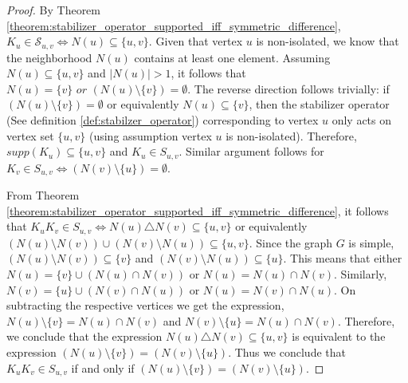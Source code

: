 \documentclass{article}
\begin{document}
\begin{proof}
By Theorem \ref{theorem:stabilizer_operator_supported_iff_symmetric_difference}, $ K_u \in \mathcal{S}_{u,v} \iff N(u) \subseteq \{u, v\} $. Given that vertex $ u $ is non-isolated, we know that the neighborhood $ N(u) $ contains at least one element. Assuming $ N(u) \subseteq \{u, v\} $ and $ |N(u)| > 1 $, it follows that $ N(u) = \{v\} \textit{ or }  (N(u) \setminus \{v\}) = \emptyset$. The reverse direction follows trivially: if $(N(u) \setminus \{v\}) = \emptyset$ or equivalently $ N(u) \subseteq \{v\} $, then the stabilizer operator (See definition \ref{def:stabilzer_operator}) corresponding to vertex $u$ only acts on vertex set $\{u, v\}$ (using assumption vertex $u$ is non-isolated). Therefore, $supp(K_u) \subseteq \{u, v\}$ and $K_u \in S_{u,v}$. Similar argument follows for $ K_v \in S_{u,v} \iff (N(v) \setminus \{u\}) = \emptyset $.

 

From Theorem \ref{theorem:stabilizer_operator_supported_iff_symmetric_difference}, it follows that $K_u K_v \in S_{u,v} \iff N(u) \triangle N(v) \subseteq \{u, v\}$ or equivalently $(N(u) \setminus N(v)) \cup (N(v) \setminus N(u)) \subseteq \{u, v\}$. Since the graph $G$ is simple, $(N(u) \setminus N(v)) \subseteq \{v\}$ and $(N(v) \setminus N(u)) \subseteq \{u\}$. This means that either $N(u) = \{v\} \cup (N(u) \cap N(v))$ or $N(u) = N(u) \cap N(v)$. Similarly, $N(v) = \{u\} \cup (N(v) \cap N(u))$ or $N(u) = N(v) \cap N(u)$. On subtracting the respective vertices we get the expression, $N(u) \setminus \{v\}= N(u) \cap N(v)$ and $N(v) \setminus \{u\}= N(u) \cap N(v)$. Therefore, we conclude that the expression $N(u) \triangle N(v) \subseteq \{u, v\}$ is equivalent to the expression  $ (N(u) \setminus \{v\}) = (N(v) \setminus \{u\}) $. Thus we conclude that $ K_u K_v \in S_{u,v} $ if and only if $ (N(u) \setminus \{v\}) = (N(v) \setminus \{u\}) $.





\end{proof}
\end{document}
